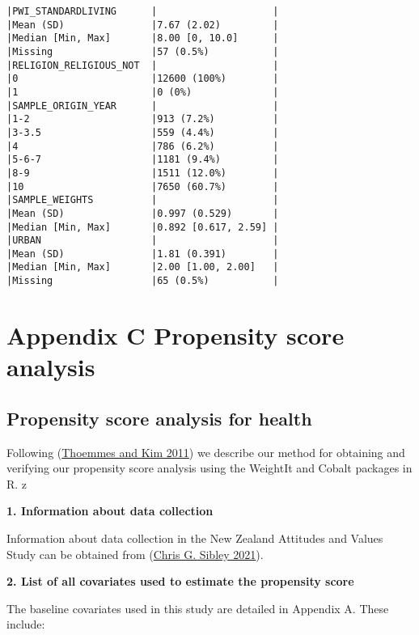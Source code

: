 \documentclass[
  singlecolumn]{report}
\begin{document}
\begin{verbatim}
|PWI_STANDARDLIVING      |                    |
|Mean (SD)               |7.67 (2.02)         |
|Median [Min, Max]       |8.00 [0, 10.0]      |
|Missing                 |57 (0.5%)           |
|RELIGION_RELIGIOUS_NOT  |                    |
|0                       |12600 (100%)        |
|1                       |0 (0%)              |
|SAMPLE_ORIGIN_YEAR      |                    |
|1-2                     |913 (7.2%)          |
|3-3.5                   |559 (4.4%)          |
|4                       |786 (6.2%)          |
|5-6-7                   |1181 (9.4%)         |
|8-9                     |1511 (12.0%)        |
|10                      |7650 (60.7%)        |
|SAMPLE_WEIGHTS          |                    |
|Mean (SD)               |0.997 (0.529)       |
|Median [Min, Max]       |0.892 [0.617, 2.59] |
|URBAN                   |                    |
|Mean (SD)               |1.81 (0.391)        |
|Median [Min, Max]       |2.00 [1.00, 2.00]   |
|Missing                 |65 (0.5%)           |
\end{verbatim}

\newpage{}

\hypertarget{appendix-c-propensity-score-analysis}{%
\section{Appendix C Propensity score
analysis}\label{appendix-c-propensity-score-analysis}}

\hypertarget{propensity-score-analysis-for-health}{%
\subsection{Propensity score analysis for
health}\label{propensity-score-analysis-for-health}}

Following (\protect\hyperlink{ref-thoemmes2011}{Thoemmes and Kim 2011})
we describe our method for obtaining and verifying our propensity score
analysis using the WeightIt and Cobalt packages in R. z

\textbf{1. Information about data collection}

Information about data collection in the New Zealand Attitudes and
Values Study can be obtained from
(\protect\hyperlink{ref-sibley2021}{Chris G. Sibley 2021}).

\textbf{2. List of all covariates used to estimate the propensity score}

The baseline covariates used in this study are detailed in Appendix A.
These include:
\end{document}
